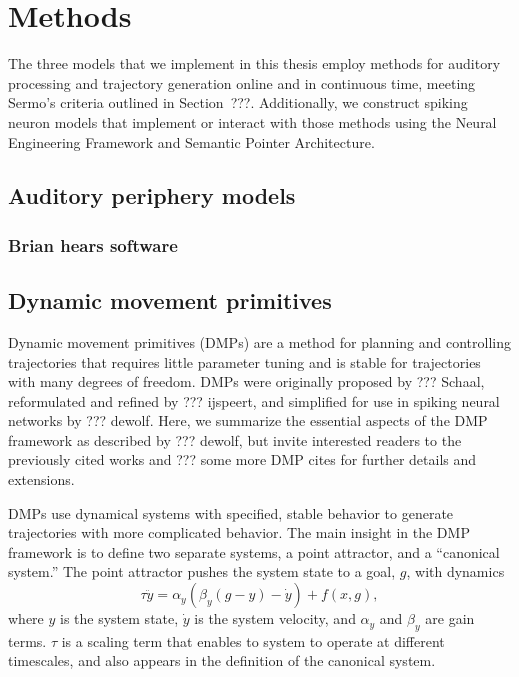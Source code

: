 \chapter{Methods}

The three models that we implement
in this thesis employ methods
for auditory processing
and trajectory generation
online and in continuous time,
meeting Sermo's criteria
outlined in Section~???.
Additionally,
we construct spiking neuron models
that implement or interact with those methods
using the Neural Engineering Framework
and Semantic Pointer Architecture.

\section{Auditory periphery models}

\subsection{Brian hears software}

\section{Dynamic movement primitives}

Dynamic movement primitives (DMPs)
are a method for planning and controlling trajectories
that requires little parameter tuning
and is stable for trajectories
with many degrees of freedom.
DMPs were originally proposed by ??? Schaal,
reformulated and refined by ??? ijspeert,
and simplified for use in spiking neural networks
by ??? dewolf.
Here, we summarize the essential aspects
of the DMP framework as described by ??? dewolf,
but invite interested readers to
the previously cited works
and ??? some more DMP cites
for further details and extensions.

DMPs use dynamical systems
with specified, stable behavior
to generate trajectories
with more complicated behavior.
The main insight in the DMP framework
is to define two separate systems,
a point attractor,
and a ``canonical system.''
The point attractor pushes
the system state to
a goal, $g$, with dynamics
\begin{equation}
  \label{dmp-pointattractor}
  \tau\ddot{y} = \alpha_y(\beta_y(g - y) - \dot{y}) + f(x, g),
\end{equation}
where $y$ is the system state,
$\dot{y}$ is the system velocity,
and $\alpha_y$ and $\beta_y$ are gain terms.
$\tau$ is a scaling term
that enables to system to operate
at different timescales,
and also appears in the definition
of the canonical system.


